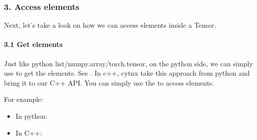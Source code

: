 \documentclass[letterpaper,10pt,english]{sphinxmanual}
\begin{document}
\subsubsection{3. Access elements}
\label{\detokenize{guide/basic_obj/Tensor_3_access:access-elements}}\label{\detokenize{guide/basic_obj/Tensor_3_access::doc}}
Next, let’s take a look on how we can access elements inside a Tensor.


\paragraph{3.1 Get elements}
\label{\detokenize{guide/basic_obj/Tensor_3_access:get-elements}}
Just like python list/numpy.array/torch.tensor, on the python side, we can simply use  to get the elements. See  .
In c++, cytnx take this approach from python and bring it to our C++ API. You can simply use the  to access elements.

For example:
\begin{itemize}
\item {} 
In python:

\end{itemize}

\begin{sphinxVerbatim}[commandchars=\\\{\},numbers=left,firstnumber=1,stepnumber=1]
  

  \PYG{p}{[}\PYG{p}{]}

  \PYG{p}{[}\PYG{p}{]}
\end{sphinxVerbatim}
\begin{itemize}
\item {} 
In C++:

\end{itemize}
\end{document}
